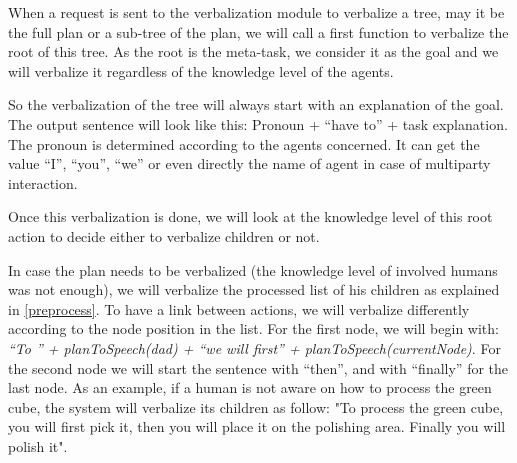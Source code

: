 \documentclass{llncs}
\begin{document}
When a request is sent to the verbalization module to verbalize a tree, may it be the full plan or a sub-tree of the plan, we will call a first function to verbalize the root of this tree. As the root is the meta-task, we consider it as the goal and we will verbalize it regardless of the knowledge level of the agents.

So the verbalization of the tree will always start with an explanation of the goal.
The output sentence will look like this:
Pronoun + ``have to'' + task explanation.
The pronoun is determined according to the agents concerned. It can get the value ``I'', ``you'', ``we'' or even directly the name of agent in case of multiparty interaction.

Once this verbalization is done, we will look at the knowledge level of this root action to decide either to verbalize children or not.





In case the plan needs to be verbalized (the knowledge level of involved humans was not enough), we will verbalize the processed list of his children as explained in \ref{preprocess}.
To have a link between actions, we will verbalize differently according to the node position in the list.
For the first node, we will begin with: \textit{``To '' + planToSpeech(dad) + ``we will first'' + planToSpeech(currentNode)}. For the second node we will start the sentence with ``then'', and with ``finally'' for the last node.
As an example, if a human is not aware on how to process the green cube, the system will verbalize its children as follow:
"To process the green cube, you will first pick it, then you will place it on the polishing area. Finally you will polish it". 
\end{document}
